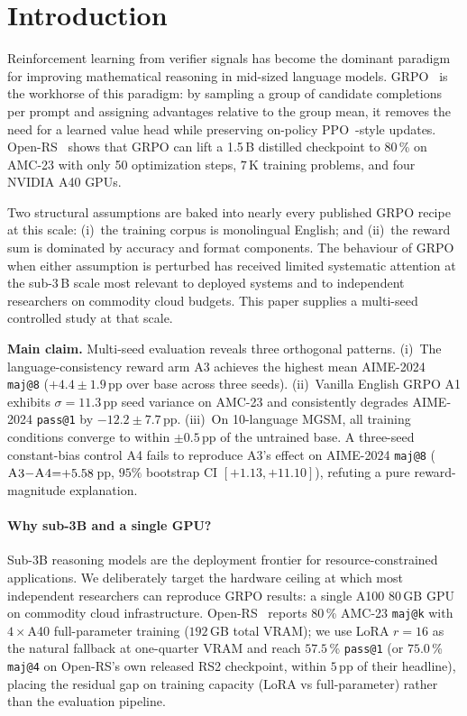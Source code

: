 \documentclass[11pt]{article}
\newcommand{\armA}{\textsc{A1}}
\newcommand{\armC}{\textsc{A3}}
\newcommand{\armD}{\textsc{A4}}
\newcommand{\boxedclaim}[1]{%
  \begin{tcolorbox}[colback=blue!4,colframe=blue!50!black,boxrule=0.5pt]%
  \small #1 \end{tcolorbox}}
\begin{document}
\section{Introduction}
\label{sec:intro}

Reinforcement learning from verifier signals has become the dominant
paradigm for improving mathematical reasoning in mid-sized language
models. GRPO~\cite{deepseekmath_2024,deepseekR1_2025} is the workhorse
of this paradigm: by sampling a group of candidate completions per
prompt and assigning advantages relative to the group mean, it removes
the need for a learned value head while preserving on-policy
PPO~\cite{schulman2017ppo}-style updates. Open-RS~\cite{openRS_2025}
shows that GRPO can lift a 1.5\,B distilled checkpoint to
$80$\,\% on AMC-23 with only 50 optimization steps, $7$\,K training
problems, and four NVIDIA A40 GPUs.

Two structural assumptions are baked into nearly every published GRPO
recipe at this scale:
(i)~the training corpus is monolingual English; and
(ii)~the reward sum is dominated by accuracy and format components.
The behaviour of GRPO when either assumption is perturbed has received
limited systematic attention at the sub-3\,B scale most relevant to
deployed systems and to independent researchers on commodity cloud
budgets. This paper supplies a multi-seed controlled study at that
scale.

\boxedclaim{%
\textbf{Main claim.} Multi-seed evaluation reveals three orthogonal
patterns. (i)~The language-consistency reward arm \armC{} achieves the
highest mean AIME-2024 \texttt{maj@8} ($+4.4 \pm 1.9$\,pp over base across
three seeds). (ii)~Vanilla English GRPO \armA{} exhibits
$\sigma{=}11.3$\,pp seed variance on AMC-23 and consistently degrades
AIME-2024 \texttt{pass@1} by $-12.2 \pm 7.7$\,pp. (iii)~On 10-language
MGSM, all training conditions converge to within $\pm 0.5$\,pp of the
untrained base. A three-seed constant-bias control \armD{} fails to
reproduce \armC{}'s effect on AIME-2024 \texttt{maj@8}
($\armC{}{-}\armD{}{=}{+}5.58$\,pp, $95\%$ bootstrap CI
$[+1.13, +11.10]$), refuting a pure reward-magnitude explanation.}

\paragraph{Why sub-3B and a single GPU?}
Sub-3B reasoning models are the deployment frontier for resource-constrained
applications. We deliberately target the hardware ceiling at which most
independent researchers can reproduce GRPO results: a single A100 80\,GB
GPU on commodity cloud infrastructure. Open-RS~\cite{openRS_2025} reports
$80$\,\% AMC-23 \texttt{maj@k} with $4{\times}$A40 full-parameter training
($192$\,GB total VRAM); we use LoRA $r{=}16$ as the natural fallback at
one-quarter VRAM and reach $57.5$\,\% \texttt{pass@1} (or $75.0$\,\%
\texttt{maj@4} on Open-RS's own released RS2 checkpoint, within $5$\,pp of
their headline), placing the residual gap on training capacity (LoRA vs
full-parameter) rather than the evaluation pipeline.
\end{document}
